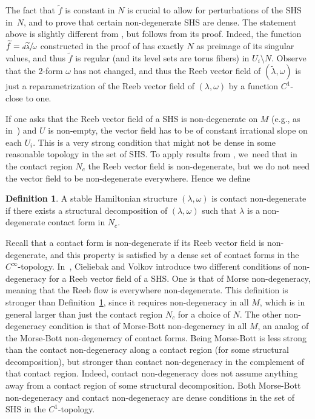 \documentclass[11pt]{article}
\newcommand{\eg}{e.g.,\xspace}
\theoremstyle{definition}
\newtheorem{defi}[theorem]{Definition}
\begin{document}
The fact that $\widetilde f$ is constant in $N$ is crucial to allow for perturbations of the SHS in~$N$, and to prove that certain non-degenerate SHS are dense. The statement above is slightly different from \cite[Th.\,4.1]{CV1}, but follows from its proof. Indeed, the function $\widetilde f=\sfrac{d\widetilde \lambda}{\omega}$ constructed in the proof of \cite[Th.\,4.1]{CV1} has exactly $N$ as preimage of its singular values, and thus $\tilde f$ is regular (and its level sets are torus fibers) in $U_i\setminus N$. Observe that the 2-form $\omega$ has not changed, and thus the Reeb vector field of $(\widetilde \lambda,\omega)$ is just a reparametrization of the Reeb vector field of $(\lambda,\omega)$ by a function $C^1$-close to one.

If one asks that the Reeb vector field of a SHS is non-degenerate on $M$ (\eg as in~\cite{MS}) and $U$ is non-empty, the vector field has to be of constant irrational slope on each $U_i$. This is a very strong condition that might not be dense in some reasonable topology in the set of SHS. To apply results from \cite{CDR}, we~need that in the contact region $N_c$ the Reeb vector field is non-degenerate, but we do not need the vector field to be non-degenerate everywhere. Hence we define

\begin{defi}\label{def:contactND}
A stable Hamiltonian structure $(\lambda,\omega)$ is contact non-degenerate if there exists a structural decomposition of $(\lambda,\omega)$ such that $\lambda$ is a non-degenerate contact form in $N_c$.
\end{defi}

Recall that a contact form is non-degenerate if its Reeb vector field is non-degenerate, and this property is satisfied by a dense set of contact forms in the $C^\infty$-topology. In~\cite[p.\,375]{CV1}, Cieliebak and Volkov introduce two different conditions of non-degeneracy for a Reeb vector field of a SHS. One is that of Morse non-degeneracy, meaning that the Reeb flow is everywhere non-degenerate. This definition is stronger than Definition~\ref{def:contactND}, since it requires non-degeneracy in all $M$, which is in general larger than just the contact region $N_c$ for a choice of $N$. The other non-degeneracy condition is that of Morse-Bott non-degeneracy in all $M$, an analog of the Morse-Bott non-degeneracy of contact forms. Being Morse-Bott is less strong than the contact non-degeneracy along a contact region (for some structural decomposition), but stronger than contact non-degeneracy in the complement of that contact region. Indeed, contact non-degeneracy does not assume anything away from a contact region of some structural decomposition. Both Morse-Bott non-degeneracy and contact non-degeneracy are dense conditions in the set of SHS in the $C^1$-topology.
\end{document}
